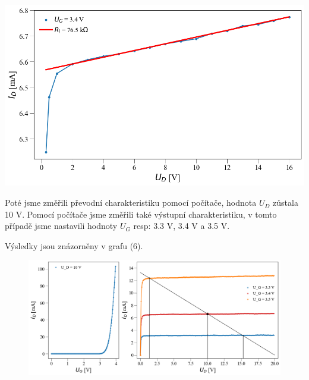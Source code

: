 \documentclass[a4paper,11pt]{article}
\begin{document}
\begin{minipage}[t]{0.5\textwidth}
                \vspace{10pt}
                \par \centering
                \includegraphics[scale=0.35]{vyst_out}
                \captionsetup{justification=centering, font=footnotesize}
                \label{fig:vyst_out}
                \raggedright
                \vspace{10pt}
                \par Poté jsme změřili převodní charakteristiku pomocí počítače, hodnota $U_D$ zůstala 10 V. Pomocí počítače jsme změřili také výstupní charakteristiku, v tomto případě jsme nastavili hodnoty $U_G$ resp: 3.3 V, 3.4 V a 3.5 V. 
                \par Výsledky jsou znázorněny v grafu (6). 
    \end{minipage}
\newpage
                \begin{figure}[ht!]
                    \centering
                    \includegraphics[scale=0.5]{pr_vs}
                    \captionsetup{justification=centering, font=footnotesize}
                    \label{fig:pr_vs}
                \end{figure}
\end{document}
